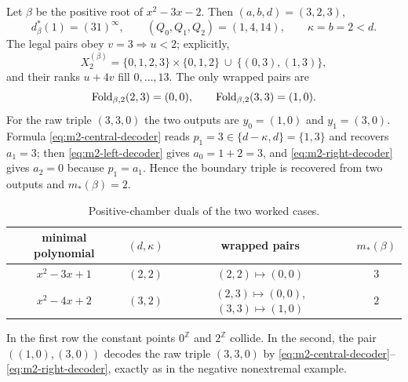 \begin{example}
Let $\beta$ be the positive root of $x^2-3x-2$.  Then
$(a,b,d)=(3,2,3)$,
\[
d_\beta^*(1)=(31)^\infty,\qquad (Q_0,Q_1,Q_2)=(1,4,14),
\qquad \kappa=b=2<d.
\]
The legal pairs obey $v=3\Rightarrow u<2$; explicitly,
\[
X_2^{(\beta)}=\{0,1,2,3\}\times\{0,1,2\}
\ \cup\ \{(0,3),(1,3)\},
\]
and their ranks $u+4v$ fill $0,\ldots,13$.  The only wrapped pairs are
\[
\mathrm{Fold}_{\beta,2}(2,3)=(0,0),\qquad
\mathrm{Fold}_{\beta,2}(3,3)=(1,0).
\]
For the raw triple $(3,3,0)$ the two outputs are
$y_0=(1,0)$ and $y_1=(3,0)$.  Formula
\eqref{eq:m2-central-decoder} reads $p_1=3\in\{d-\kappa,d\}=\{1,3\}$ and
recovers $a_1=3$; then \eqref{eq:m2-left-decoder} gives
$a_0=1+2=3$, and \eqref{eq:m2-right-decoder} gives $a_2=0$ because
$p_1=a_1$.  Hence the boundary triple is recovered from two outputs and
$m_*(\beta)=2$.
\end{example}

\begin{table}[t]
\centering
\caption{Positive-chamber duals of the two worked cases.}
\label{tab:positive-dual-examples}
\begin{tabular}{cccc}
\toprule
minimal polynomial & $(d,\kappa)$ & wrapped pairs & $m_*(\beta)$\\
\midrule
$x^2-3x+1$ & $(2,2)$ & $(2,2)\mapsto(0,0)$ & $3$\\
$x^2-4x+2$ & $(3,2)$ & $(2,3)\mapsto(0,0)$, $(3,3)\mapsto(1,0)$ & $2$\\
\bottomrule
\end{tabular}
\end{table}

In the first row the constant points $0^{\mathbb Z}$ and $2^{\mathbb Z}$
collide.  In the second, the pair $((1,0),(3,0))$ decodes the raw triple
$(3,3,0)$ by \eqref{eq:m2-central-decoder}--\eqref{eq:m2-right-decoder},
exactly as in the negative nonextremal example.
